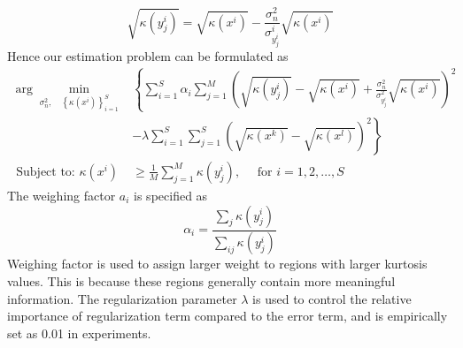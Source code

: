 \documentclass[11pt]{article}
\begin{document}
$$\sqrt { \kappa \left( y _ { j } ^ { i } \right) } = \sqrt { \kappa \left( x ^ { i } \right) } - \frac { \sigma _ { n } ^ { 2 } } { \sigma _ { y _ { j } ^ { i } } ^ { i } } \sqrt { \kappa \left( x ^ { i } \right) }$$
Hence our estimation problem can be formulated as
\begin{equation}
\begin{aligned}
\arg \min_{ \sigma _ { n } ^ { 2 } , \quad \left\{ \kappa \left( x ^ { i } \right) \right\} _ { i = 1 } ^ { S }} & \left\{ \sum _ { i = 1 } ^ { S } \alpha _ { i } \sum _ { j = 1 } ^ { M } \left( \sqrt { \kappa \left( y _ { j } ^ { i } \right) } - \sqrt { \kappa \left( x ^ { i } \right) } +  \frac { \sigma _ { n } ^ { 2 } } { \sigma _ { y _ { j } ^ { i } } ^ { 2 } } \sqrt { \kappa \left( x ^ { i } \right) } \right) ^ { 2 }  \right.  \\
 & \left. - \lambda \sum _ { i = 1 } ^ { S } \sum _ { j = 1 } ^ { S } \left( \sqrt { \kappa \left( x ^ { k } \right) } - \sqrt { \kappa \left( x ^ { l } \right) } \right) ^ { 2 } \right\}  \\
  \text { Subject to: } \kappa \left( x ^ { i } \right) &\geq \frac { 1 } { M } \sum _ { j = 1 } ^ { M } \kappa \left( y _ { j } ^ { i } \right) , \quad \text { for } i = 1,2 , \ldots , S 
 \end{aligned}
 \end{equation}
The weighing factor $a_i$ is specified as 
$$\alpha _ { i } = \frac { \sum _ { j } \kappa \left( y _ { j } ^ { i } \right) } { \sum _ { i j } \kappa \left( y _ { j } ^ { i } \right) }$$
Weighing factor is used to assign larger weight to regions with larger kurtosis values. This is because
these regions generally contain more meaningful information. The regularization parameter $\lambda$ is used to control the relative importance of regularization term compared to the error term, and is empirically set as 0.01 in experiments.
\end{document}
